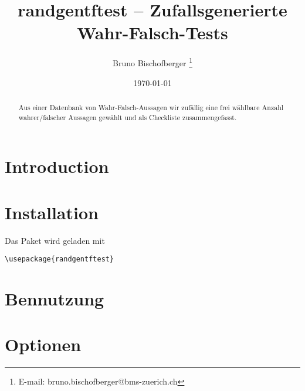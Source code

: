 \documentclass[a4paper]{article}
\begin{document}
\title{{\sffamily randgentftest} -- Zufallsgenerierte Wahr-Falsch-Tests}

\author{Bruno Bischofberger \thanks{E-mail: bruno.bischofberger@bms-zuerich.ch}}

\date{\today}

\maketitle

\tableofcontents

\begin{abstract}
  Aus einer Datenbank von Wahr-Falsch-Aussagen wir zufällig eine frei wählbare Anzahl wahrer/falscher Aussagen gewählt und als Checkliste zusammengefasst.
\end{abstract}

\section{Introduction}

\section{Installation}
Das Paket wird geladen mit

\begin{verbatim}
\usepackage{randgentftest}
\end{verbatim}

\section{Bennutzung}

\section{Optionen}
\end{document}
